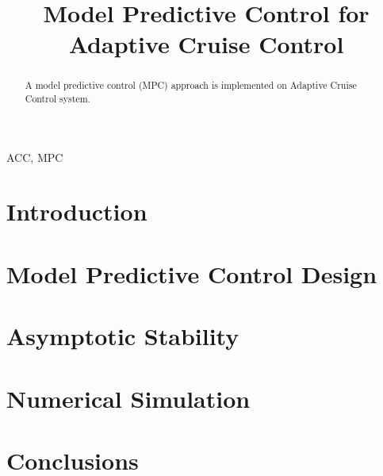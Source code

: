 \documentclass[conference]{IEEEtran}
\begin{document}
\title{Model Predictive Control for \\Adaptive Cruise Control}

\author{

\and
{}

}

\maketitle
\thispagestyle{fancy}

\begin{abstract}
A model predictive control (MPC) approach is implemented on Adaptive Cruise Control system. 
\end{abstract}

\begin{IEEEkeywords}
 ACC, MPC
\end{IEEEkeywords}

\section{Introduction}


\section{Model Predictive Control Design}


\section{Asymptotic Stability}


\section{Numerical Simulation}


\section{Conclusions}





\end{document}
